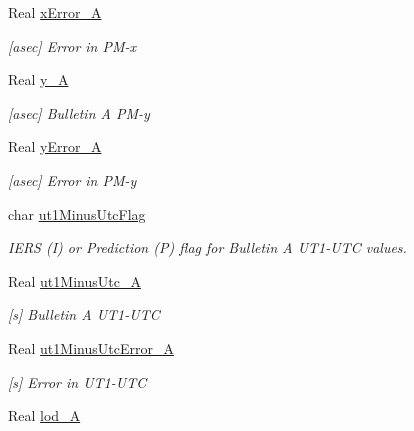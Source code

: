 \begin{DoxyCompactItemize}
Real \hyperlink{structostk_1_1physics_1_1coord_1_1frame_1_1provider_1_1iers_1_1_finals2000_a_1_1_data_a2b53b9bdcb3b9c180d6c6d31c94646e2}{x\+Error\+\_\+A}
\begin{DoxyCompactList}\small\item\em \mbox{[}asec\mbox{]} Error in P\+M-\/x \end{DoxyCompactList}\item 
Real \hyperlink{structostk_1_1physics_1_1coord_1_1frame_1_1provider_1_1iers_1_1_finals2000_a_1_1_data_a7aae14e63ea2890def909f5348a62a20}{y\+\_\+A}
\begin{DoxyCompactList}\small\item\em \mbox{[}asec\mbox{]} Bulletin A P\+M-\/y \end{DoxyCompactList}\item 
Real \hyperlink{structostk_1_1physics_1_1coord_1_1frame_1_1provider_1_1iers_1_1_finals2000_a_1_1_data_a532cbc4a06e66819bbc795225f04b52c}{y\+Error\+\_\+A}
\begin{DoxyCompactList}\small\item\em \mbox{[}asec\mbox{]} Error in P\+M-\/y \end{DoxyCompactList}\item 
char \hyperlink{structostk_1_1physics_1_1coord_1_1frame_1_1provider_1_1iers_1_1_finals2000_a_1_1_data_a7dc1c6ec36efed7eccbb90af6dcb965f}{ut1\+Minus\+Utc\+Flag}
\begin{DoxyCompactList}\small\item\em I\+E\+RS (I) or Prediction (P) flag for Bulletin A U\+T1-\/\+U\+TC values. \end{DoxyCompactList}\item 
Real \hyperlink{structostk_1_1physics_1_1coord_1_1frame_1_1provider_1_1iers_1_1_finals2000_a_1_1_data_aab443366cec89efb39031a892cff62e0}{ut1\+Minus\+Utc\+\_\+A}
\begin{DoxyCompactList}\small\item\em \mbox{[}s\mbox{]} Bulletin A U\+T1-\/\+U\+TC \end{DoxyCompactList}\item 
Real \hyperlink{structostk_1_1physics_1_1coord_1_1frame_1_1provider_1_1iers_1_1_finals2000_a_1_1_data_a20c10000ed47346f671f69788cf07bc0}{ut1\+Minus\+Utc\+Error\+\_\+A}
\begin{DoxyCompactList}\small\item\em \mbox{[}s\mbox{]} Error in U\+T1-\/\+U\+TC \end{DoxyCompactList}\item 
Real \hyperlink{structostk_1_1physics_1_1coord_1_1frame_1_1provider_1_1iers_1_1_finals2000_a_1_1_data_a1bcfc94f3b4e32ea39ec0e51f96a9e06}{lod\+\_\+A}

\end{DoxyCompactItemize}
